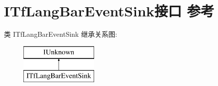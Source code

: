 \hypertarget{interface_i_tf_lang_bar_event_sink}{}\section{I\+Tf\+Lang\+Bar\+Event\+Sink接口 参考}
\label{interface_i_tf_lang_bar_event_sink}
类 I\+Tf\+Lang\+Bar\+Event\+Sink 继承关系图\+:\begin{figure}[H]
\begin{center}
\leavevmode
\includegraphics[height=2.000000cm]{interface_i_tf_lang_bar_event_sink}
\end{center}
\end{figure}
